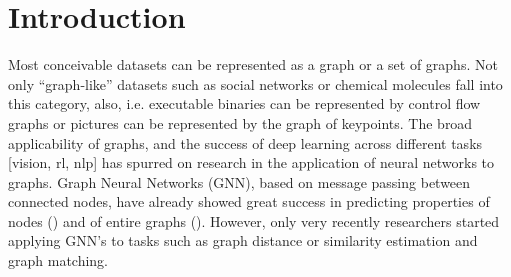 \section{Introduction}

Most conceivable datasets can be represented as a graph or a set of graphs. Not only “graph-like” datasets such as social networks or chemical molecules fall into this category, also, i.e. executable binaries can be represented by control flow graphs or pictures can be represented by the graph of keypoints. %
The broad applicability of graphs, and the success of deep learning across different tasks [vision, rl, nlp] has spurred on research in the application of neural networks to graphs. Graph Neural Networks (GNN), based on message passing between connected nodes, have already showed great success in predicting properties of nodes (\cite{kipf2017}) and of entire graphs (\citealp{gilmer2017}). However, only very recently researchers started applying GNN's to tasks such as graph distance or similarity estimation and graph matching.

